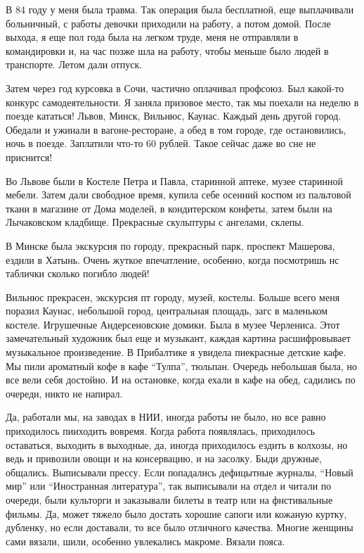 \begin{itemize}
В 84 году у меня была травма. Так операция была бесплатной, еще выплачивали
больничный, с работы девочки приходили на работу, а потом домой. После выхода,
я еще пол года была на легком труде, меня не отправляли в командировки и, на
час позже шла на работу, чтобы меньше было людей в транспорте. Летом дали
отпуск. 

Затем через год курсовка в Сочи, частично оплачивал профсоюз. Был какой-то
конкурс самодеятельности. Я заняла призовое место, так мы поехали на неделю в
поезде кататься! Львов, Минск, Вильнюс, Каунас. Каждый день другой город.
Обедали и ужинали в вагоне-ресторане, а обед в том городе, где остановились,
ночь в поезде. Заплатили что-то 60 рублей. Такое сейчас даже во сне не
приснится! 

Во Львове были в Костеле Петра и Павла, старинной аптеке, музее старинной
мебели. Затем дали свободное время, купила себе осенний костюм из пальтовой
ткани в магазине от Дома моделей, в кондитерском конфеты, затем были на
Лычаковском кладбище. Прекрасные скульптуры с ангелами, склепы. 

В Минске была экскурсия по городу, прекрасный парк, проспект Машерова, ездили в
Хатынь. Очень жуткое впечатление, особенно, когда посмотришь нс таблички
сколько погибло людей! 

Вильнюс прекрасен, экскурсия пт городу, музей, костелы. Больше всего меня
поразил Каунас, небольшой город, центральная площадь, загс в маленьком костеле.
Игрушечные Андерсеновские домики. Была в музее Черлениса. Этот замечательный
художник был еще и музыкант, каждая картина расшифровывает музыкальное
произведение. В Прибалтике я увидела пиекрасные детские кафе. Мы пили ароматный
кофе в кафе \enquote{Тулпа}, тюльпан. Очередь небольшая была, но все вели себя
достойно. И на остановке, когда ехали в кафе на обед, садились по очереди,
никто не напирал.

Да, работали мы, на заводах в НИИ, иногда работы не было, но все равно
приходилось пииходить вовремя. Когда работа появлялась, приходилось оставаться,
выходить в выходные, да, иногда приходилось ездить в колхозы, но ведь и
привозили овощи и на консервацию, и на засолку. Быди дружные, общались.
Выписывали прессу. Если попадались дефицытные журналы, \enquote{Новый мир} или
\enquote{Иностранная литература}, так выписывали на отдел и читали по очереди,
были культорги и заказывали билеты в театр или на фнстивальные фильмы. Да,
может тяжело было достать хорошие сапоги или кожаную куртку, дубленку, но если
доставали, то все было отличного качества. Многие женщины сами вязали, шили,
особенно увлекались макроме. Вязали пояса.


\end{itemize}
